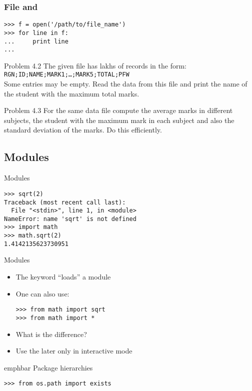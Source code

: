\documentclass[14pt,compress]{beamer}
\newcommand{\emphbar}[1]
{\begin{beamercolorbox}[rounded=true]{emphbar} 
      {#1}
 \end{beamercolorbox}
}
\newcounter{time}
\newcommand{\inctime}[1]{\addtocounter{time}{#1}{\tiny \thetime\ m}}
\newcommand{\typ}[1]{\texttt{#1}}
\newcommand{\kwrd}[1]{ \texttt{\textbf{\color{blue}{#1}}}  }
\begin{document}
\begin{frame}[fragile]
    \frametitle{File and \kwrd{for}}
\begin{lstlisting}
>>> f = open('/path/to/file_name')
>>> for line in f:
...     print line
...
\end{lstlisting}
\end{frame}

\begin{frame}{Problem 4.2}
    The given file has lakhs of records in the form:\\
    \typ{RGN;ID;NAME;MARK1;\ldots;MARK5;TOTAL;PFW}\\
    Some entries may be empty.  Read the data from this file and print the
    name of the student with the maximum total marks.
\end{frame}

\begin{frame}{Problem 4.3}
    For the same data file compute the average marks in different
    subjects, the student with the maximum mark in each subject and also
    the standard deviation of the marks.  Do this efficiently.

    \inctime{20}
\end{frame}


\subsection{Modules}

\begin{frame}[fragile]
    {Modules}
\begin{lstlisting}
>>> sqrt(2)
Traceback (most recent call last):
  File "<stdin>", line 1, in <module>
NameError: name 'sqrt' is not defined
>>> import math        
>>> math.sqrt(2)
1.4142135623730951
\end{lstlisting}
\end{frame}

\begin{frame}[fragile]
    {Modules}
  \begin{itemize}
    \item The \kwrd{import} keyword ``loads'' a module
    \item One can also use:
      \begin{lstlisting}
>>> from math import sqrt
>>> from math import *
      \end{lstlisting}    
    \item What is the difference?
    \item \alert{Use the later only in interactive mode}
    \end{itemize}
  \emphbar{Package hierarchies}
      \begin{lstlisting}
>>> from os.path import exists
      \end{lstlisting}
\end{frame}
\end{document}
